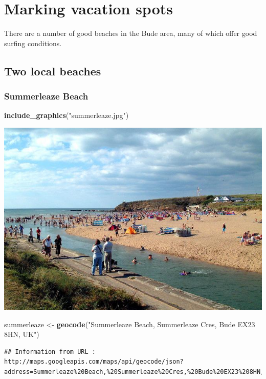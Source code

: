 \documentclass[]{article}
\newenvironment{Shaded}{\begin{snugshade}}{\end{snugshade}}
\newcommand{\KeywordTok}[1]{\textcolor[rgb]{0.13,0.29,0.53}{\textbf{#1}}}
\newcommand{\NormalTok}[1]{#1}
\newcommand{\StringTok}[1]{\textcolor[rgb]{0.31,0.60,0.02}{#1}}
\begin{document}
\hypertarget{marking-vacation-spots}{%
\section{Marking vacation spots}\label{marking-vacation-spots}}

There are a number of good beaches in the Bude area, many of which offer
good surfing conditions.

\hypertarget{two-local-beaches}{%
\subsection{Two local beaches}\label{two-local-beaches}}

\hypertarget{summerleaze-beach}{%
\subsubsection{Summerleaze Beach}\label{summerleaze-beach}}

\begin{Shaded}
\begin{Highlighting}[]
\KeywordTok{include_graphics}\NormalTok{(}\StringTok{"summerleaze.jpg"}\NormalTok{)}
\end{Highlighting}
\end{Shaded}

\includegraphics[width=0.5\linewidth]{summerleaze}

\begin{Shaded}
\begin{Highlighting}[]
\NormalTok{summerleaze <-}\StringTok{ }\KeywordTok{geocode}\NormalTok{(}\StringTok{"Summerleaze Beach, Summerleaze Cres, Bude EX23 8HN, UK"}\NormalTok{)}
\end{Highlighting}
\end{Shaded}

\begin{verbatim}
## Information from URL : http://maps.googleapis.com/maps/api/geocode/json?address=Summerleaze%20Beach,%20Summerleaze%20Cres,%20Bude%20EX23%208HN,%20UK&sensor=false
\end{verbatim}
\end{document}
